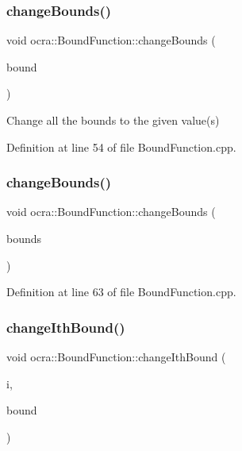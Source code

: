 \subsubsection{\texorpdfstring{change\+Bounds()}{changeBounds()}\hspace{0.1cm}{\footnotesize\ttfamily [1/2]}}
{\footnotesize\ttfamily void ocra\+::\+Bound\+Function\+::change\+Bounds (\begin{DoxyParamCaption}\item[{const double}]{bound }\end{DoxyParamCaption})}

Change all the bounds to the given value(s) 

Definition at line 54 of file Bound\+Function.\+cpp.

\hypertarget{classocra_1_1BoundFunction_aa69f4a52a46914e6ecbffb525e7d1314}{}\label{classocra_1_1BoundFunction_aa69f4a52a46914e6ecbffb525e7d1314} 
\subsubsection{\texorpdfstring{change\+Bounds()}{changeBounds()}\hspace{0.1cm}{\footnotesize\ttfamily [2/2]}}
{\footnotesize\ttfamily void ocra\+::\+Bound\+Function\+::change\+Bounds (\begin{DoxyParamCaption}\item[{const Vector\+Xd \&}]{bounds }\end{DoxyParamCaption})}



Definition at line 63 of file Bound\+Function.\+cpp.

\hypertarget{classocra_1_1BoundFunction_ad9a5cb9442e2129111d189e8063304ad}{}\label{classocra_1_1BoundFunction_ad9a5cb9442e2129111d189e8063304ad} 
\subsubsection{\texorpdfstring{change\+Ith\+Bound()}{changeIthBound()}}
{\footnotesize\ttfamily void ocra\+::\+Bound\+Function\+::change\+Ith\+Bound (\begin{DoxyParamCaption}\item[{const int}]{i,  }\item[{const double}]{bound }\end{DoxyParamCaption})}

